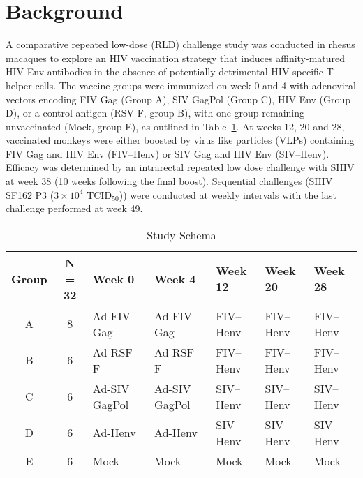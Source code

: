 \section{Background}
A comparative repeated low-dose (RLD) challenge study was conducted in rhesus macaques to explore an HIV vaccination strategy that induces affinity-matured HIV Env antibodies in the absence of potentially detrimental HIV-specific T helper cells. The vaccine groups were immunized on week 0 and 4 with adenoviral vectors encoding FIV Gag (Group A), SIV GagPol (Group C), HIV Env (Group D), or a control antigen (RSV-F, group B), with one group remaining unvaccinated (Mock, group E), as outlined in Table~\ref{schema}. At weeks 12, 20 and 28, vaccinated monkeys were either boosted by virus like particles (VLPs) containing FIV Gag and HIV Env (FIV--Henv) or SIV Gag and HIV Env (SIV--Henv). Efficacy was determined by an intrarectal repeated low dose challenge with SHIV at week 38 (10 weeks following the final boost). Sequential challenges (SHIV SF162 P3 ($3 \times 10^{4}$  $\textrm{TCID}_{50}$)) were conducted at weekly intervals with the last challenge performed at week 49.

\begingroup\small
\begin{table}[h]
\centering
\begin{tabular}{ccp{2.8cm}p{2.8cm}p{2.2cm}p{2.2cm}p{2.2cm}}
\hline
Group & N = 32 & Week 0 & Week 4 & Week 12 & Week 20 & Week 28 \\
\hline
A & 8 & Ad-FIV Gag\footnotemark[1] & Ad-FIV Gag\footnotemark[1] & FIV--Henv\footnotemark[2] & FIV--Henv\footnotemark[2] & FIV--Henv\footnotemark[2] \\
B & 6 & Ad-RSF-F\footnotemark[1] & Ad-RSF-F\footnotemark[1] & FIV--Henv\footnotemark[2] & FIV--Henv\footnotemark[2] & FIV--Henv\footnotemark[2] \\
C & 6 & Ad-SIV GagPol\footnotemark[1] & Ad-SIV GagPol\footnotemark[1] &  SIV--Henv\footnotemark[2] &  SIV--Henv\footnotemark[2] &  SIV--Henv\footnotemark[2] \\
D & 6 & Ad-Henv\footnotemark[1] & Ad-Henv\footnotemark[1] &  SIV--Henv\footnotemark[2] &  SIV--Henv\footnotemark[2] &  SIV--Henv\footnotemark[2] \\
E & 6 & Mock & Mock & Mock & Mock & Mock \\
\hline
\end{tabular}
\caption{Study Schema}
\label{schema}
\end{table}
\endgroup
